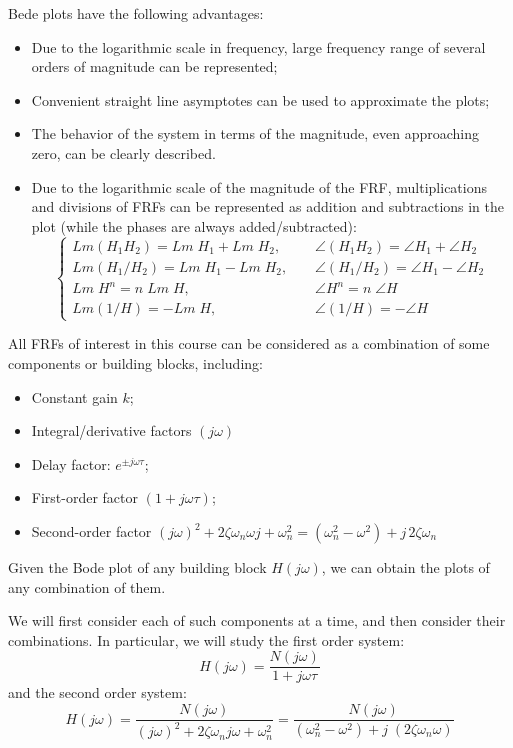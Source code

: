 \documentclass{article}
\begin{document}
Bede plots have the following advantages:
\begin{itemize}
\item Due to the logarithmic scale in frequency, large frequency range of 
  several orders of magnitude can be represented;

\item Convenient straight line asymptotes can be used to approximate the plots;

\item The behavior of the system in terms of the magnitude, even
  approaching zero, can be clearly described.
    
\item Due to the logarithmic scale of the magnitude of the FRF, multiplications 
  and divisions of FRFs can be represented as addition and subtractions in the 
  plot (while the phases are always added/subtracted):
  \begin{equation} 
    \left\{ \begin{array}{ll}
      Lm(H_1H_2)=Lm\;H_1+Lm\;H_2,&\;\;\;\;\angle (H_1H_2)=\angle H_1+\angle H_2\\
      Lm(H_1/H_2)=Lm\;H_1-Lm\;H_2,&\;\;\;\;\angle (H_1/H_2)=\angle H_1-\angle H_2\\
      Lm \;H^n=n\;Lm \;H,&\;\;\;\;\angle H^n=n\;\angle H \\
      Lm (1/H)=-Lm\;H,&\;\;\;\;\angle (1/H)=-\angle H \end{array} \right. 
  \end{equation}
\end{itemize}

All FRFs of interest in this course can be considered as a combination of 
some components or building blocks, including:
\begin{itemize}
  \item Constant gain $k$;
  \item Integral/derivative factors $(j\omega)$
  \item Delay factor: $e^{\pm j\omega \tau}$;
  \item First-order factor $(1+j\omega\tau)$;
  \item Second-order factor 
    $(j\omega)^2+2\zeta\omega_n\omega j+\omega_n^2
    =(\omega_n^2-\omega^2)+j\,2\zeta\omega_n$
\end{itemize}
Given the Bode plot of any building block $H(j\omega)$, we can obtain the plots
of any combination of them.

We will first consider each of such components at a time, and then consider 
their combinations. In particular, we will study the first order system:
\begin{equation} 
  H(j\omega)=\frac{N(j\omega)}{1+j\omega \tau} 
\end{equation}
and the second order system:
\begin{equation}
  H(j\omega)=\frac{N(j\omega)}{(j\omega)^2+2\zeta\omega_n j\omega +\omega_n^2}
  =\frac{N(j\omega)}{(\omega_n^2-\omega^2)+j\;(2\zeta\omega_n \omega) }
\end{equation}
\end{document}
